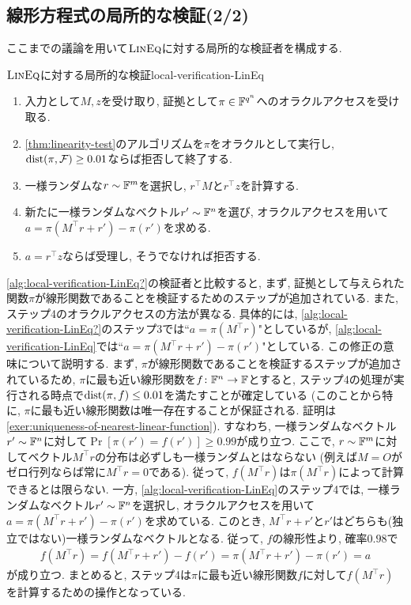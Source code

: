 \subsection{線形方程式の局所的な検証(2/2)}
ここまでの議論を用いて$\textsc{LinEq}$に対する局所的な検証者を構成する.
\begin{algorithm}{$\textsc{LinEq}$に対する局所的な検証}{local-verification-LinEq}
  \begin{enumerate}
    \item 入力として$M,z$を受け取り, 証拠として$\pi \in \mathbb{F}^{q^n}$へのオラクルアクセスを受け取る.
    \item \cref{thm:linearity-test}のアルゴリズムを$\pi$をオラクルとして実行し, $\mathrm{dist}(\pi,\mathcal{F})\ge 0.01$ならば拒否して終了する.
    \item 一様ランダムな$r\sim\mathbb{F}^m$を選択し, $r^\top M$と$r^\top z$を計算する.
    \item 新たに一様ランダムなベクトル$r'\sim\mathbb{F}^n$を選び, オラクルアクセスを用いて$a=\pi(M^\top r + r') - \pi(r')$を求める.
    \item $a=r^\top z$ならば受理し, そうでなければ拒否する.
  \end{enumerate}
\end{algorithm}
\cref{alg:local-verification-LinEq?}の検証者と比較すると,
まず, 証拠として与えられた関数$\pi$が線形関数であることを検証するためのステップが追加されている.
また, ステップ4のオラクルアクセスの方法が異なる.
具体的には, \cref{alg:local-verification-LinEq?}のステップ3では“$a=\pi(M^\top r)$"としているが,
\cref{alg:local-verification-LinEq}では“$a=\pi(M^\top r + r') - \pi(r')$"としている.
この修正の意味について説明する.
まず, $\pi$が線形関数であることを検証するステップが追加されているため, $\pi$に最も近い線形関数を$f\colon\mathbb{F}^n\to\mathbb{F}$とすると,
ステップ4の処理が実行される時点で$\mathrm{dist}(\pi,f)\le 0.01$を満たすことが確定している (このことから特に, $\pi$に最も近い線形関数は唯一存在することが保証される. 証明は\cref{exer:uniqueness-of-nearest-linear-function}).
すなわち, 一様ランダムなベクトル$r'\sim\mathbb{F}^n$に対して$\Pr[\pi(r')=f(r')] \ge 0.99$が成り立つ.
ここで, $r\sim\mathbb{F}^m$に対してベクトル$M^\top r$の分布は必ずしも一様ランダムとはならない (例えば$M=O$がゼロ行列ならば常に$M^\top r=0$である).
従って, $f(M^\top r)$は$\pi(M^\top r)$によって計算できるとは限らない.
一方, \cref{alg:local-verification-LinEq}のステップ4では, 一様ランダムなベクトル$r'\sim\mathbb{F}^n$を選択し, オラクルアクセスを用いて$a=\pi(M^\top r + r') - \pi(r')$を求めている.
このとき, $M^\top r + r'$と$r'$はどちらも(独立ではない)一様ランダムなベクトルとなる.
従って, $f$の線形性より, 確率$0.98$で
\begin{align*}
  f(M^\top r) = f(M^\top r + r') - f(r') = \pi(M^\top r+r') - \pi(r') = a
\end{align*}
が成り立つ.
まとめると, ステップ4は$\pi$に最も近い線形関数$f$に対して$f(M^\top r)$を計算するための操作となっている.

